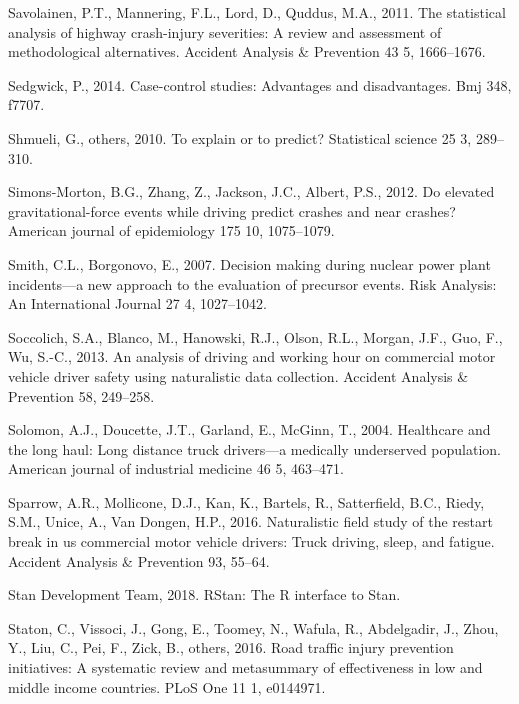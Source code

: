 \documentclass[12pt]{book}
\numberwithin{equation}{chapter}
\begin{document}
\leavevmode\hypertarget{ref-savolainen2011statistical}{}%
Savolainen, P.T., Mannering, F.L., Lord, D., Quddus, M.A., 2011. The statistical analysis of highway crash-injury severities: A review and assessment of methodological alternatives. Accident Analysis \& Prevention 43 5, 1666--1676.

\leavevmode\hypertarget{ref-sedgwick2014case}{}%
Sedgwick, P., 2014. Case-control studies: Advantages and disadvantages. Bmj 348, f7707.

\leavevmode\hypertarget{ref-shmueli2010explain}{}%
Shmueli, G., others, 2010. To explain or to predict? Statistical science 25 3, 289--310.

\leavevmode\hypertarget{ref-simons2012elevated}{}%
Simons-Morton, B.G., Zhang, Z., Jackson, J.C., Albert, P.S., 2012. Do elevated gravitational-force events while driving predict crashes and near crashes? American journal of epidemiology 175 10, 1075--1079.

\leavevmode\hypertarget{ref-smith2007decision}{}%
Smith, C.L., Borgonovo, E., 2007. Decision making during nuclear power plant incidents---a new approach to the evaluation of precursor events. Risk Analysis: An International Journal 27 4, 1027--1042.

\leavevmode\hypertarget{ref-soccolich2013analysis}{}%
Soccolich, S.A., Blanco, M., Hanowski, R.J., Olson, R.L., Morgan, J.F., Guo, F., Wu, S.-C., 2013. An analysis of driving and working hour on commercial motor vehicle driver safety using naturalistic data collection. Accident Analysis \& Prevention 58, 249--258.

\leavevmode\hypertarget{ref-solomon2004healthcare}{}%
Solomon, A.J., Doucette, J.T., Garland, E., McGinn, T., 2004. Healthcare and the long haul: Long distance truck drivers---a medically underserved population. American journal of industrial medicine 46 5, 463--471.

\leavevmode\hypertarget{ref-sparrow2016naturalistic}{}%
Sparrow, A.R., Mollicone, D.J., Kan, K., Bartels, R., Satterfield, B.C., Riedy, S.M., Unice, A., Van Dongen, H.P., 2016. Naturalistic field study of the restart break in us commercial motor vehicle drivers: Truck driving, sleep, and fatigue. Accident Analysis \& Prevention 93, 55--64.

\leavevmode\hypertarget{ref-rstancitation}{}%
Stan Development Team, 2018. RStan: The R interface to Stan.

\leavevmode\hypertarget{ref-staton2016road}{}%
Staton, C., Vissoci, J., Gong, E., Toomey, N., Wafula, R., Abdelgadir, J., Zhou, Y., Liu, C., Pei, F., Zick, B., others, 2016. Road traffic injury prevention initiatives: A systematic review and metasummary of effectiveness in low and middle income countries. PLoS One 11 1, e0144971.
\end{document}
